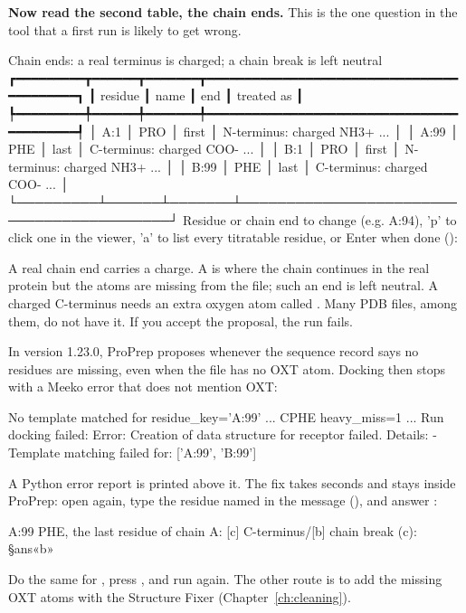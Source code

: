 \textbf{Now read the second table, the chain ends.} This is the one question
in the tool that a first run is likely to get wrong.

\begin{screen}
Chain ends: a real terminus is charged; a chain break is left neutral
┏━━━━━━━━━┳━━━━━━┳━━━━━━━┳━━━━━━━━━━━━━━━━━━━━━━━━━━━━━━━━━━━━━━━━━━┓
┃ residue ┃ name ┃ end   ┃ treated as                               ┃
┡━━━━━━━━━╇━━━━━━╇━━━━━━━╇━━━━━━━━━━━━━━━━━━━━━━━━━━━━━━━━━━━━━━━━━━┩
│ A:1     │ PRO  │ first │ N-terminus: charged NH3+ ...              │
│ A:99    │ PHE  │ last  │ C-terminus: charged COO- ...              │
│ B:1     │ PRO  │ first │ N-terminus: charged NH3+ ...              │
│ B:99    │ PHE  │ last  │ C-terminus: charged COO- ...              │
└─────────┴──────┴───────┴──────────────────────────────────────────┘
Residue or chain end to change (e.g. A:94), 'p' to click one in the
viewer, 'a' to list every titratable residue, or Enter when done ():
\end{screen}

A real chain end carries a charge. A  is where the chain
continues in the real protein but the atoms are missing from the file; such an
end is left neutral. A charged C-terminus needs an extra oxygen atom called
. Many PDB files,  among them, do not have it. If you
accept the proposal, the run fails.

\begin{watchout}
In version 1.23.0, ProPrep proposes  whenever
the sequence record says no residues are missing, even when the file has no
OXT atom. Docking then stops with a Meeko error that does not mention OXT:
\begin{screen}
No template matched for residue_key='A:99' ... CPHE heavy_miss=1 ...
Run docking failed:
Error: Creation of data structure for receptor failed.
Details:
- Template matching failed for: ['A:99', 'B:99']
\end{screen}
A Python error report is printed above it. The fix takes seconds and stays
inside ProPrep: open  again, type the residue named in the message
(), and answer :
\begin{screen}
A:99 PHE, the last residue of chain A: [c] C-terminus/[b] chain break (c): §ans«b»
\end{screen}
Do the same for , press , and run again. The other
route is to add the missing OXT atoms with the Structure Fixer
(Chapter~\ref{ch:cleaning}).
\end{watchout}


